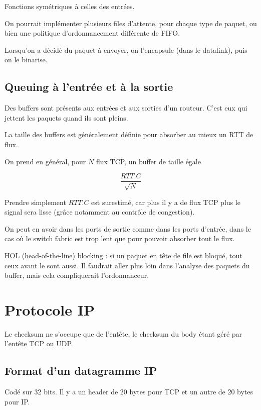 	
	Fonctions symétriques à celles des entrées.
	
	On pourrait implémenter plusieurs files d'attente, pour chaque type de paquet, ou bien une politique d'ordonnancement différente de FIFO.
	
	Lorsqu'on a décidé du paquet à envoyer, on l'encapsule (dans le datalink), puis on le binarise.
	
	
	\subsection{Queuing à l'entrée et à la sortie}
	
	Des buffers sont présents aux entrées et aux sorties d'un routeur. C'est eux qui jettent les paquets quand ils sont pleins.
	
	La taille des buffers est généralement définie pour absorber au mieux un RTT de flux.
	
	On prend en général, pour $N$ flux TCP, un buffer de taille égale 
	
	$$\frac{RTT . C}{\sqrt{N}} $$
	
	Prendre simplement $RTT.C$ est surestimé, car plus il y a de flux TCP plus le signal sera lisse (grâce notamment au contrôle de congestion).
	
	On peut en avoir dans les ports de sortie comme dans les ports d'entrée, dans le cas où le switch fabric est trop lent que pour pouvoir absorber tout le flux.
	
	HOL (head-of-the-line) blocking : si un paquet en tête de file est bloqué, tout ceux avant le sont aussi. Il faudrait aller plus loin dans l'analyse des paquets du buffer, mais cela compliquerait l'ordonnanceur. 
	
	
\section{Protocole IP}

Le checksum ne s'occupe que de l'entête, le checksum du body étant géré par l'entête TCP ou UDP.


	\subsection{Format d'un datagramme IP}
	
	
	Codé sur 32 bits. Il y a un header de 20 bytes pour TCP et un autre de 20 bytes pour IP. 		 												
